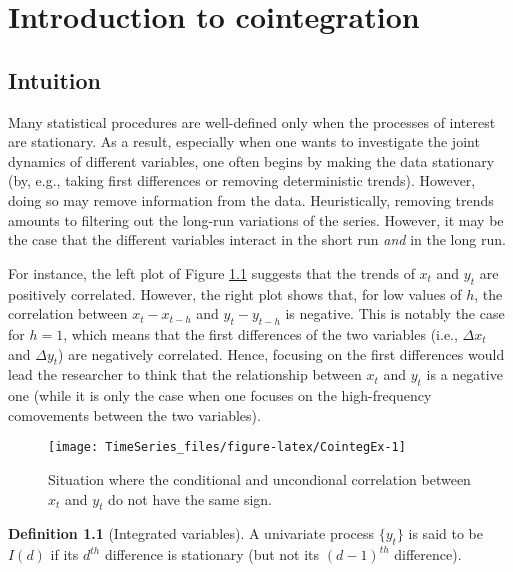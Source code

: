 \documentclass[
  12pt,
]{book}
\theoremstyle{definition}
\newtheorem{definition}{Definition}[chapter]
\theoremstyle{definition}
\theoremstyle{definition}
\theoremstyle{definition}
\theoremstyle{remark}
\begin{document}
\hypertarget{cointeg}{%
\chapter{Introduction to cointegration}\label{cointeg}}

\hypertarget{intuition}{%
\section{Intuition}\label{intuition}}

Many statistical procedures are well-defined only when the processes of interest are stationary. As a result, especially when one wants to investigate the joint dynamics of different variables, one often begins by making the data stationary (by, e.g., taking first differences or removing deterministic trends). However, doing so may remove information from the data. Heuristically, removing trends amounts to filtering out the long-run variations of the series. However, it may be the case that the different variables interact in the short run \emph{and} in the long run.

For instance, the left plot of Figure \ref{fig:CointegEx} suggests that the trends of \(x_t\) and \(y_t\) are positively correlated. However, the right plot shows that, for low values of \(h\), the correlation between \(x_t - x_{t-h}\) and \(y_t - y_{t-h}\) is negative. This is notably the case for \(h=1\), which means that the first differences of the two variables (i.e., \(\Delta x_t\) and \(\Delta y_t\)) are negatively correlated. Hence, focusing on the first differences would lead the researcher to think that the relationship between \(x_t\) and \(y_t\) is a negative one (while it is only the case when one focuses on the high-frequency comovements between the two variables).

\begin{figure}
\texttt{[image: TimeSeries\_files/figure-latex/CointegEx-1]} \caption{Situation where the conditional and uncondional correlation between $x_t$ and $y_t$ do not have the same sign.}\label{fig:CointegEx}
\end{figure}

\begin{definition}[Integrated variables]
\protect\hypertarget{def:Id}{}\label{def:Id}A univariate process \(\{y_t\}\) is said to be \(I(d)\) if its \(d^{th}\) difference is stationary (but not its \((d-1)^{th}\) difference).
\end{definition}
\end{document}

